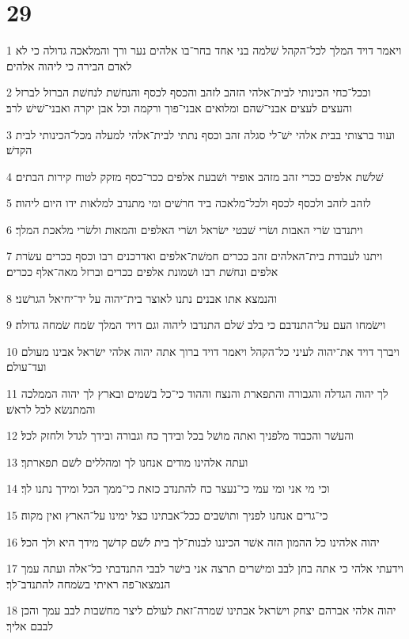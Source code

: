 \chapter{29}

\par 1 ויאמר דויד המלך לכל־הקהל שׁלמה בני אחד בחר־בו אלהים נער ורך והמלאכה גדולה כי לא לאדם הבירה כי ליהוה אלהים׃
\par 2 וככל־כחי הכינותי לבית־אלהי הזהב לזהב והכסף לכסף והנחשׁת לנחשׁת הברזל לברזל והעצים לעצים אבני־שׁהם ומלואים אבני־פוך ורקמה וכל אבן יקרה ואבני־שׁישׁ לרב׃
\par 3 ועוד ברצותי בבית אלהי ישׁ־לי סגלה זהב וכסף נתתי לבית־אלהי למעלה מכל־הכינותי לבית הקדשׁ׃
\par 4 שׁלשׁת אלפים ככרי זהב מזהב אופיר ושׁבעת אלפים ככר־כסף מזקק לטוח קירות הבתים׃
\par 5 לזהב לזהב ולכסף לכסף ולכל־מלאכה ביד חרשׁים ומי מתנדב למלאות ידו היום ליהוה׃
\par 6 ויתנדבו שׂרי האבות ושׂרי שׁבטי ישׂראל ושׂרי האלפים והמאות ולשׂרי מלאכת המלך׃
\par 7 ויתנו לעבודת בית־האלהים זהב ככרים חמשׁת־אלפים ואדרכנים רבו וכסף ככרים עשׂרת אלפים ונחשׁת רבו ושׁמונת אלפים ככרים וברזל מאה־אלף ככרים׃
\par 8 והנמצא אתו אבנים נתנו לאוצר בית־יהוה על יד־יחיאל הגרשׁני׃
\par 9 וישׂמחו העם על־התנדבם כי בלב שׁלם התנדבו ליהוה וגם דויד המלך שׂמח שׂמחה גדולה׃
\par 10 ויברך דויד את־יהוה לעיני כל־הקהל ויאמר דויד ברוך אתה יהוה אלהי ישׂראל אבינו מעולם ועד־עולם׃
\par 11 לך יהוה הגדלה והגבורה והתפארת והנצח וההוד כי־כל בשׁמים ובארץ לך יהוה הממלכה והמתנשׂא לכל לראשׁ׃
\par 12 והעשׁר והכבוד מלפניך ואתה מושׁל בכל ובידך כח וגבורה ובידך לגדל ולחזק לכל׃
\par 13 ועתה אלהינו מודים אנחנו לך ומהללים לשׁם תפארתך׃
\par 14 וכי מי אני ומי עמי כי־נעצר כח להתנדב כזאת כי־ממך הכל ומידך נתנו לך׃
\par 15 כי־גרים אנחנו לפניך ותושׁבים ככל־אבתינו כצל ימינו על־הארץ ואין מקוה׃
\par 16 יהוה אלהינו כל ההמון הזה אשׁר הכיננו לבנות־לך בית לשׁם קדשׁך מידך היא ולך הכל׃
\par 17 וידעתי אלהי כי אתה בחן לבב ומישׁרים תרצה אני בישׁר לבבי התנדבתי כל־אלה ועתה עמך הנמצאו־פה ראיתי בשׂמחה להתנדב־לך׃
\par 18 יהוה אלהי אברהם יצחק וישׂראל אבתינו שׁמרה־זאת לעולם ליצר מחשׁבות לבב עמך והכן לבבם אליך׃
